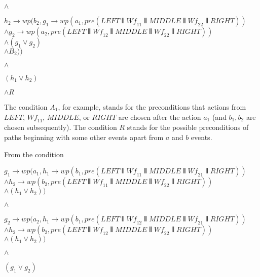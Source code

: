 \documentclass[11pt]{article}
\newcommand{\Wf}{\mathit{Wf}}
\begin{document}
\noindent
$\land$

\noindent
$h_2 \longrightarrow wp(b_2,g_1 \longrightarrow wp(a_1,pre(LEFT \interleave \Wf_{11} \interleave MIDDLE \interleave \Wf_{22} \interleave RIGHT))$ \\
\hspace*{60pt} $\land g_2 \longrightarrow wp(a_2,pre(LEFT \interleave \Wf_{12} \interleave MIDDLE \interleave \Wf_{22} \interleave RIGHT))$ \\ 
\hspace*{60pt} $\land (g_1 \lor g_2)$ \\
\hspace*{60pt} $\land B_2))$

\noindent
$\land$

\noindent
$(h_1 \lor h_2)$

\noindent
$\land R$

\noindent
The condition $A_1$, for example, stands for the preconditions that actions from $LEFT$, $\Wf_{11}$, $MIDDLE$, or $RIGHT$ are chosen after the action $a_1$ (and $b_1,b_2$ are chosen subsequently). The condition $R$ stands for the possible preconditions of paths beginning with some other events apart from $a$ and $b$ events. 

\noindent
From the condition

\noindent
$g_1 \longrightarrow wp(a_1,h_1 \longrightarrow wp(b_1,pre(LEFT \interleave \Wf_{11} \interleave MIDDLE \interleave \Wf_{21} \interleave RIGHT))$ \\
\hspace*{60pt}          $\land h_2 \longrightarrow wp(b_2,pre(LEFT \interleave \Wf_{11} \interleave MIDDLE \interleave \Wf_{22} \interleave RIGHT))$ \\
\hspace*{60pt}          $\land (h_1 \lor h_2))$ 

\noindent
$\land$

\noindent
$g_2 \longrightarrow wp(a_2,h_1 \longrightarrow wp(b_1,pre(LEFT \interleave \Wf_{12} \interleave MIDDLE \interleave \Wf_{21} \interleave RIGHT))$ \\
\hspace*{60pt}       $\land h_2 \longrightarrow wp(b_2,pre(LEFT \interleave \Wf_{12} \interleave MIDDLE \interleave \Wf_{22} \interleave RIGHT))$ \\ 
\hspace*{60pt}       $\land (h_1 \lor h_2))$

\noindent
$\land$

\noindent
$(g_1 \lor g_2)$
\end{document}
